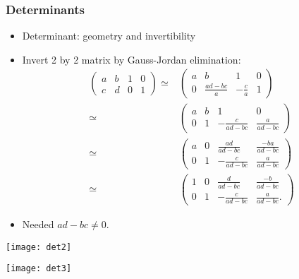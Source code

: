 \documentclass[compress]{beamer}
\theoremstyle{definition}
\begin{document}
\begin{frame}
  \frametitle{Determinants}
  \begin{itemize}
  \item Determinant: geometry and invertibility
  \item Invert 2 by 2 matrix by Gauss-Jordan elimination:
    \begin{align*}
      \begin{pmatrix} a & b & 1 & 0 \\
        c & d & 0 & 1 
      \end{pmatrix} \simeq & 
      \begin{pmatrix} a & b & 1 & 0 \\
        0 & \frac{ad-bc}{a} & -\frac{c}{a} & 1 
      \end{pmatrix} \\
      \simeq & 
      \begin{pmatrix} a & b & 1 & 0 \\
        0 & 1 & -\frac{c}{ad-bc} & \frac{a}{ad-bc}
      \end{pmatrix} \\
      \simeq & 
      \begin{pmatrix} a & 0 & \frac{ad}{ad-bc} & \frac{-ba}{ad-bc} \\
        0 & 1 & -\frac{c}{ad-bc} & \frac{a}{ad-bc}
      \end{pmatrix} \\
      \simeq & 
      \begin{pmatrix} 1 & 0 & \frac{d}{ad-bc} & \frac{-b}{ad-bc} \\
        0 & 1 & -\frac{c}{ad-bc} & \frac{a}{ad-bc}.
      \end{pmatrix}
    \end{align*}
  \item Needed $ad-bc \neq 0$.
  \end{itemize}
\end{frame}

\begin{frame}
  \texttt{[image: det2]}
\end{frame}

\begin{frame}
  \texttt{[image: det3]} 
\end{frame}
\end{document}
